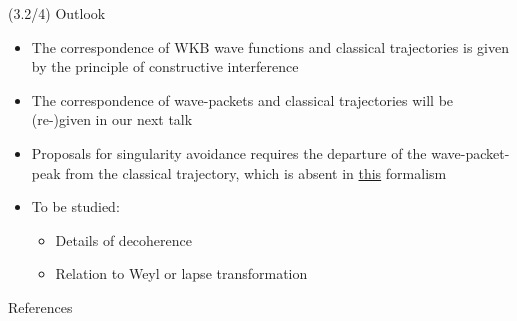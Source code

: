 \documentclass[mathserif]{beamer}
\begin{document}
\begin{frame}{(3.2/4) Outlook}
    \begin{itemize}
        \item
        The correspondence of WKB wave functions and classical trajectories
        is given by the principle of constructive interference
        
        \item
        The correspondence of wave-packets and classical trajectories will be
            (re-)given in our next talk
    \end{itemize}

    \begin{itemize}
        \item
        Proposals for singularity avoidance requires the \alert{departure}
        of the wave-packet-peak from the classical 
        trajectory, which is \alert{absent} in
        \underline{this} formalism
    \end{itemize}
    \begin{itemize}
        \item To be studied:
        \begin{itemize}
        \item
            Details of decoherence
        \item
            Relation to Weyl or lapse transformation
        \end{itemize}
    \end{itemize}
\end{frame}


\appendix

\begin{frame}[allowframebreaks]{References}

\printbibliography

\end{frame}





\end{document}
